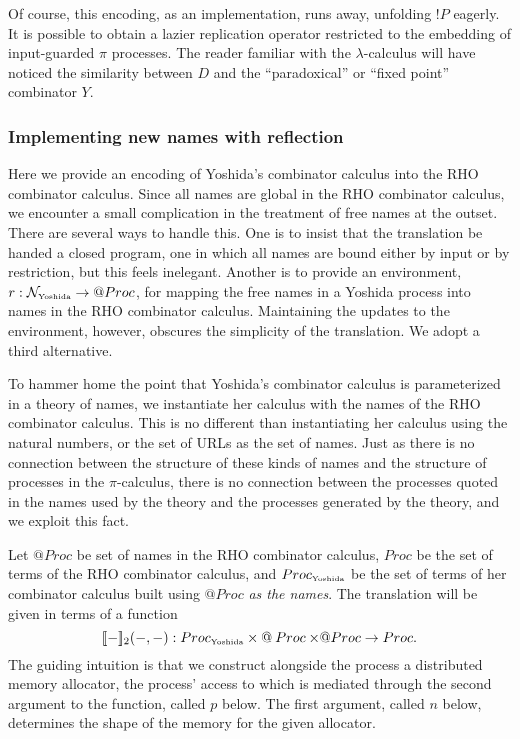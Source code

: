 \documentclass{llncs}
\makeatletter
\newcommand{\pic}{$\pi$-calculus}
\newcommand{\ldb}{[\![}
\newcommand{\rdb}{]\!]}
\newcommand{\quotep}[1]{\mathsf{@}#1}
\newcommand{\bangp}[1]{! #1}
\newcommand{\meaningof}[1]{\ldb #1 \rdb}
\newcommand{\Proc}{\mathbin{Proc}}
\newcommand{\QProc}{\quotep{\mathbin{Proc}}}
\newcommand{\red}{\rightarrow}
\makeatother
\begin{document}
Of course, this encoding, as an implementation, runs away, unfolding
$\bangp{P}$ eagerly. It is possible to obtain a lazier
replication operator restricted to the embedding of
input-guarded $\pi$ processes. The reader familiar with the
$\lambda$-calculus will have noticed the similarity between $D$ and
the ``paradoxical'' or ``fixed point'' combinator $Y$.

\subsubsection{Implementing new names with reflection}

Here we provide an encoding of Yoshida's combinator calculus into the
RHO combinator calculus. Since all names are global in the RHO
combinator calculus, we encounter a small complication in the
treatment of free names at the outset. There are several ways to
handle this.  One is to insist that the translation be handed a closed
program, one in which all names are bound either by input or by
restriction, but this feels inelegant. Another is to provide
an environment, $r : \mathcal{N}_{\mbox{\tiny Yoshida}} \rightarrow \QProc$, for
mapping the free names in a Yoshida process into names in the RHO
combinator calculus. Maintaining the updates to the environment,
however, obscures the simplicity of the translation. We adopt a third
alternative.

To hammer home the point that Yoshida's combinator calculus is
parameterized in a theory of names, we instantiate her calculus with
the names of the RHO combinator calculus. This is no different than
instantiating her calculus using the natural numbers, or the set of URLs as the
set of names. Just as there is no connection between the structure of
these kinds of names and the structure of processes in the {\pic},
there is no connection between the processes quoted in the names used
by the theory and the processes generated by the theory, and we
exploit this fact.

Let $\QProc$ be set of names in the RHO combinator calculus, $\Proc$
be the set of terms of the RHO combinator calculus, and
$\Proc_{\mbox{\tiny Yoshida}}$ be the set of terms of her combinator
calculus built using $\QProc$ \emph{as the names}. The translation will be
given in terms of a function \[\meaningof{-}_2( -, - ) : 
    \Proc_{\mbox{\tiny Yoshida}} \times \QProc {\times} \QProc \red \Proc.\] 
The guiding intuition is that we construct alongside the process a distributed memory
allocator, the process' access to which is mediated through the second argument
to the function, called $p$ below. The first argument, called $n$ below, determines the shape of the memory for the given allocator.
\end{document}
